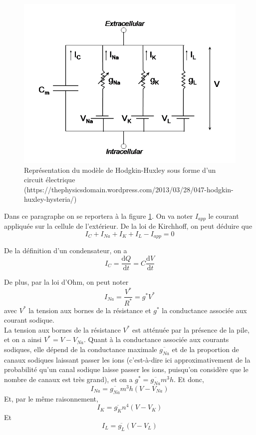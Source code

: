 \documentclass[12pt]{scrartcl}
\newcommand{\dd}{\mathrm{d}}
\begin{document}
\clearpage
\begin{figure}[!h]
\centering
\includegraphics[scale=0.5]{imgs/3.png}
\caption{Représentation du modèle de Hodgkin-Huxley sous forme d'un circuit électrique (\scriptsize{https://thephysicsdomain.wordpress.com/2013/03/28/047-hodgkin-huxley-hysteria/})}
\label{HHFIG}
\end{figure}

Dans ce paragraphe on se reportera à la figure \ref{HHFIG}. On va noter $I_{app}$ le courant appliquée sur la cellule de l'extérieur. De la loi de Kirchhoff, on peut déduire que \begin{equation} I_C+I_{Na}+I_K+I_L-I_{app} = 0 \label{Toteq}\end{equation} 

De la définition d'un condensateur, on a \begin{equation} I_C = \frac{\dd Q}{\dd t} = C\frac{\dd V}{\dd t} \label{Ceq}\end{equation} 

De plus, par la loi d'Ohm, on peut noter \begin{equation}I_{Na} = \frac{V^*}{R^*} = g^*V^* \nonumber\end{equation} avec $V^*$ la tension aux bornes de la résistance et $g^*$ la conductance associée aux courant sodique.\\La tension aux bornes de la résistance $V^*$ est atténuée par la présence de la pile, et on a ainsi $V^* = V - V_{Na}$. Quant à la conductance associée aux courants sodiques, elle dépend de la conductance maximale $\overline{g_{Na}}$ et de la proportion de canaux sodiques laissant passer les ions (c'est-à-dire ici approximativement de la probabilité qu'un canal sodique laisse passer les ions, puisqu'on considère que le nombre de canaux est très grand), et on a $g^* = \overline{g_{Na}}m^3h$. Et donc, \begin{equation}I_{Na} = \overline{g_{Na}}m^3h(V-V_{Na}) \label{Naeq}\end{equation}
Et, par le même raisonnement, 
\begin{equation}I_{K} = \overline{g_{K}}n^4(V-V_{K}) \label{Keq}\end{equation}
Et
\begin{equation}I_{L} = \overline{g_{L}}(V-V_{L}) \label{Leq}\end{equation}
\end{document}
